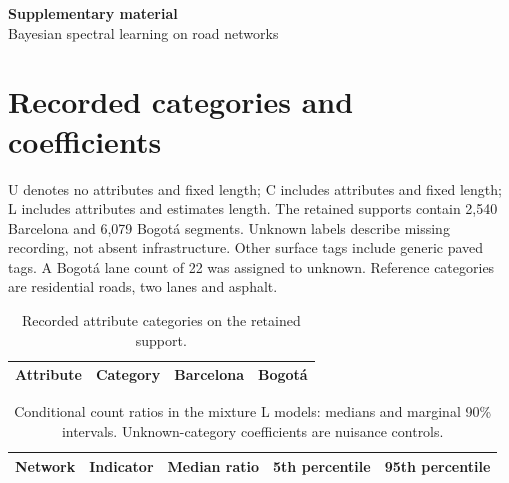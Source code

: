 \documentclass[11pt]{article}
\begin{document}
\begin{center}\large\textbf{Supplementary material}\\[3pt]
\normalsize Bayesian spectral learning on road networks\end{center}
\section{Recorded categories and coefficients}
U denotes no attributes and fixed length; C includes attributes and fixed length; L includes attributes and estimates length. The retained supports contain 2,540 Barcelona and 6,079 Bogot\'a segments. Unknown labels describe missing recording, not absent infrastructure. Other surface tags include generic paved tags. A Bogot\'a lane count of 22 was assigned to unknown. Reference categories are residential roads, two lanes and asphalt.
\par
\begin{table}[!htbp]\centering\small
\caption{Recorded attribute categories on the retained support.}
\begin{tabular}{llrr}\toprule Attribute & Category & Barcelona & Bogot\'a\\\midrule
\end{tabular}\end{table}
\FloatBarrier
\par

\par
\begin{table}[!htbp]\centering\small
\caption{Conditional count ratios in the mixture L models: medians and marginal 90\% intervals. Unknown-category coefficients are nuisance controls.}
\begin{tabular}{llrrr}\toprule Network & Indicator & Median ratio & 5th percentile & 95th percentile\\\midrule
\end{tabular}\end{table}
\FloatBarrier
\par
\clearpage
\end{document}
